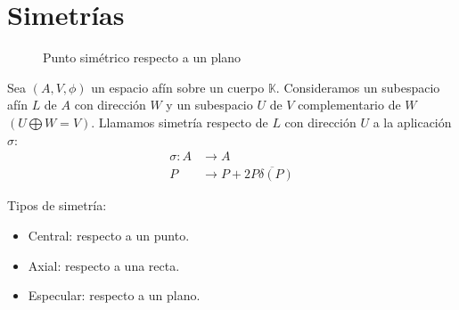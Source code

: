 \documentclass{./Geometria.tex}
\begin{document}
\section{Simetrías}
\begin{figure}[ht]
\centering



\caption{Punto simétrico respecto a un plano}
\end{figure}
\begin{defin}
Sea $(A,V, \phi)$ un espacio afín sobre un cuerpo $\mathbb{K}$. Consideramos un subespacio afín $L$ de $A$ con dirección $W$ y un subespacio $U$ de $V$ complementario de $W$ $(U \bigoplus W = V)$. Llamamos simetría respecto de $L$ con dirección $U$ a la aplicación $\sigma$:
\begin{equation}
	\begin{split}
		\sigma: A &\to A\\
		P &\to P +2 \overline{P \delta(P)}
	\end{split}
\end{equation}
\end{defin}
Tipos de simetría:
\begin{itemize}
	\item Central: respecto a un punto.
	\item Axial: respecto a una recta.
	\item Especular: respecto a un plano.
\end{itemize}
\end{document}
